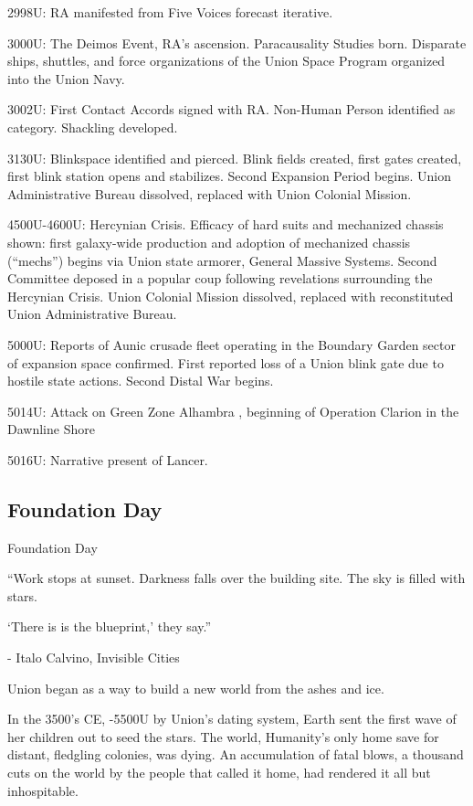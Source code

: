 2998U: RA manifested from Five Voices forecast iterative.


3000U: The Deimos Event, RA’s ascension. Paracausality Studies born. Disparate ships, shuttles,
and force organizations of the Union Space Program organized into the Union Navy.





3002U: First Contact Accords signed with RA. Non-Human Person identified as category.
Shackling developed.


3130U: Blinkspace identified and pierced. Blink fields created, first gates created, first blink
station opens and stabilizes. Second Expansion Period begins. Union Administrative Bureau
dissolved, replaced with Union Colonial Mission.


4500U-4600U: Hercynian Crisis. Efficacy of hard suits and mechanized chassis shown: first
galaxy-wide production and adoption of mechanized chassis (“mechs”) begins via Union state
armorer, General Massive Systems. Second Committee deposed in a popular coup following
revelations surrounding the Hercynian Crisis. Union Colonial Mission dissolved, replaced with
reconstituted Union Administrative Bureau.


5000U: Reports of Aunic crusade fleet operating in the Boundary Garden sector of expansion
space confirmed. First reported loss of a Union blink gate due to hostile state actions. Second
Distal War begins.


5014U: Attack on Green Zone Alhambra , beginning of Operation Clarion in the Dawnline Shore


5016U: Narrative present of Lancer.


\subsection{Foundation Day}

Foundation Day

         “Work stops at sunset. Darkness falls over the building site. The sky is filled with stars.

         ‘There is is the blueprint,’ they say.”

                      -    Italo Calvino, Invisible Cities

Union began as a way to build a new world from the ashes and ice.


In the 3500’s CE, -5500U by Union’s dating system, Earth sent the first wave of her children out
to seed the stars. The world, Humanity’s only home save for distant, fledgling colonies, was
dying. An accumulation of fatal blows, a thousand cuts on the world by the people that called it
home, had rendered it all but inhospitable.


